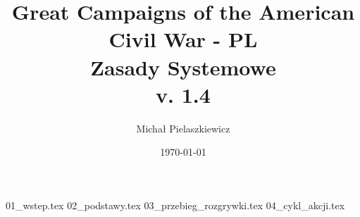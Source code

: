 \documentclass[10pt,twoside,a4paper,table]{article}
\title{Great Campaigns of the American Civil War - PL \\ Zasady Systemowe \\ v. 1.4}
\author{Michał Pielaszkiewicz}
\date{\today}
\newcommand\emptypage{
    \null
    \thispagestyle{empty}
    \addtocounter{page}{-1}
    \newpage
}
\begin{document}
    \maketitle
    \emptypage
    \tableofcontents
    \emptypage
    \begin{multicols*}{2}
        {01_wstep.tex}
        {02_podstawy.tex}
        {03_przebieg_rozgrywki.tex}
        {04_cykl_akcji.tex}
    \end{multicols*}
\end{document}
